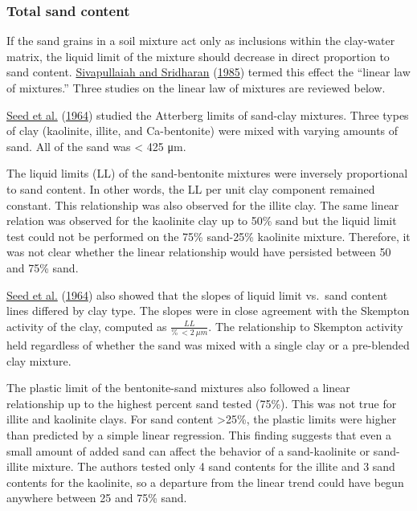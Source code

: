 \documentclass[
  letterpaper,
  openany]{book}
\begin{document}
\hypertarget{total-sand-content}{%
\subsubsection{Total sand content}\label{total-sand-content}}

If the sand grains in a soil mixture act only as inclusions within the clay-water matrix, the liquid limit of the mixture should decrease in direct proportion to sand content.
\protect\hyperlink{ref-Sivapullaiah1985}{Sivapullaiah and Sridharan} (\protect\hyperlink{ref-Sivapullaiah1985}{1985}) termed this effect the ``linear law of mixtures.''
Three studies on the linear law of mixtures are reviewed below.

\protect\hyperlink{ref-Seed1964a}{Seed et al.} (\protect\hyperlink{ref-Seed1964a}{1964}) studied the Atterberg limits of sand-clay mixtures. Three types of clay (kaolinite, illite, and Ca-bentonite) were mixed with varying amounts of sand. All of the sand was \textless{} 425 μm.

The liquid limits (LL) of the sand-bentonite mixtures were inversely proportional to sand content.
In other words, the LL per unit clay component remained constant.
This relationship was also observed for the illite clay.
The same linear relation was observed for the kaolinite clay up to 50\% sand but the liquid limit test could not be performed on the 75\% sand-25\% kaolinite mixture.
Therefore, it was not clear whether the linear relationship would have persisted between 50 and 75\% sand.

\protect\hyperlink{ref-Seed1964a}{Seed et al.} (\protect\hyperlink{ref-Seed1964a}{1964}) also showed that the slopes of liquid limit vs.~sand content lines differed by clay type.
The slopes were in close agreement with the Skempton activity of the clay, computed as \(\frac{LL}{\%~<2~\mu m}\).
The relationship to Skempton activity held regardless of whether the sand was mixed with a single clay or a pre-blended clay mixture.

The plastic limit of the bentonite-sand mixtures also followed a linear relationship up to the highest percent sand tested (75\%).
This was not true for illite and kaolinite clays.
For sand content \textgreater25\%, the plastic limits were higher than predicted by a simple linear regression.
This finding suggests that even a small amount of added sand can affect the behavior of a sand-kaolinite or sand-illite mixture.
The authors tested only 4 sand contents for the illite and 3 sand contents for the kaolinite, so a departure from the linear trend could have begun anywhere between 25 and 75\% sand.
\end{document}
